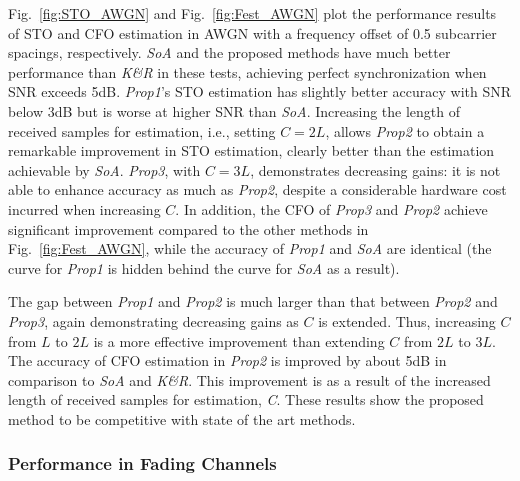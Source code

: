 Fig.~\ref{fig:STO_AWGN} and  Fig.~\ref{fig:Fest_AWGN} plot the performance results of STO and CFO estimation in AWGN with a frequency offset of 0.5 subcarrier spacings, respectively.
\textit{SoA} and the proposed methods have much better performance than \textit{K\&R} in these tests, achieving perfect synchronization when SNR exceeds 5{\thinspace}dB.
\textit{Prop1}'s STO estimation has slightly better accuracy with SNR below 3{\thinspace}dB but is worse at higher SNR than \textit{SoA}.
Increasing the length of received samples for estimation, i.e., setting $C = 2L$, allows \textit{Prop2} to obtain a remarkable improvement in STO estimation, clearly better than the estimation achievable by \textit{SoA}.
\textit{Prop3}, with $C = 3L$, demonstrates decreasing gains: it is not able to enhance accuracy as much as \textit{Prop2}, despite a considerable hardware cost incurred when increasing $C$.
In addition, the CFO of \textit{Prop3} and \textit{Prop2} achieve significant improvement compared to the other methods in Fig.~\ref{fig:Fest_AWGN}, while the accuracy of \textit{Prop1} and \textit{SoA} are identical (the curve for \textit{Prop1} is hidden behind the curve for \textit{SoA} as a result).

The gap between \textit{Prop1} and \textit{Prop2} is much larger than that between \textit{Prop2} and \textit{Prop3}, again demonstrating decreasing gains as $C$ is extended. Thus, increasing $C$ from $L$ to $2L$ is a more effective improvement than extending $C$ from $2L$ to $3L$.
The accuracy of CFO estimation in \textit{Prop2} is improved by about 5{\thinspace}dB in comparison to \textit{SoA} and \textit{K\&R}.
This improvement is as a result of the increased length of received samples for estimation, \textit{C}.
These results show the proposed method to be competitive with state of the art methods.

\subsubsection{Performance in Fading Channels}

